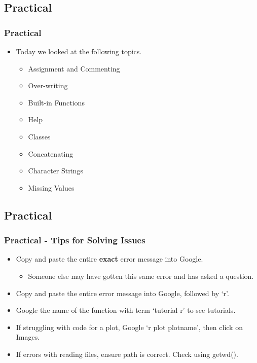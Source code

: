 \documentclass[11pt]{beamer}
\begin{document}
\subsection{Practical}
\begin{frame}
\frametitle{Practical}
\begin{itemize}
\item Today we looked at the following topics. 
\vspace{0.1in}
\begin{itemize}
\item Assignment and Commenting
\item Over-writing
\item Built-in Functions
\item Help
\item Classes
\item Concatenating
\item Character Strings
\item Missing Values
\end{itemize}
\end{itemize}
\end{frame}

\subsection{Practical}
\begin{frame}
\frametitle{Practical - Tips for Solving Issues}
\begin{itemize}
\item Copy and paste the entire \textbf{exact} error message into Google.
\begin{itemize}
\item Someone else may have gotten this same error and has asked a question.
\end{itemize}
\vspace{0.1in}
\item Copy and paste the entire error message into Google, followed by `r'.
\vspace{0.1in}
\item Google the name of the function with term `tutorial r' to see tutorials.
\vspace{0.1in}
\item If struggling with code for a plot, Google `r plot plotname', then click on Images.
\vspace{0.1in}
\item If errors with reading files, ensure path is correct. Check using getwd().
\end{itemize}
\end{frame}
\end{document}
